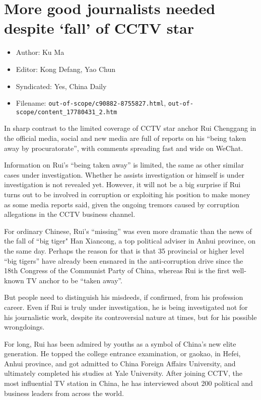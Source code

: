 \section{More good journalists needed despite `fall' of CCTV star}

\begin{itemize}
	\item Author: Ku Ma
	\item Editor: Kong Defang, Yao Chun
	\item Syndicated: Yes, China Daily
	\item Filename: \texttt{out-of-scope/c90882-8755827.html},
	\texttt{out-of-scope/content_17780431_2.htm}
\end{itemize}

\begin{displayquote}

	In sharp contrast to the limited coverage of CCTV star anchor Rui
	Chenggang in the official media, social and new media are full of
	reports on his ``being taken away by procuratorate'', with comments
	spreading fast and wide on WeChat.

	Information on Rui's ``being taken away'' is limited, the same as other
	similar cases under investigation. Whether he assists investigation or
	himself is under investigation is not revealed yet. However, it will not
	be a big surprise if Rui turns out to be involved in corruption or
	exploiting his position to make money as some media reports said, given
	the ongoing tremors caused by corruption allegations in the CCTV
	business channel.

	For ordinary Chinese, Rui's ``missing'' was even more dramatic than the
	news of the fall of ``big tiger" Han Xiancong, a top political adviser
	in Anhui province, on the same day. Perhaps the reason for that is that
	35 provincial or higher level ``big tigers'' have already been ensnared
	in the anti-corruption drive since the 18th Congress of the Communist
	Party of China, whereas Rui is the first well-known TV anchor to be
	``taken away''.

	But people need to distinguish his misdeeds, if confirmed, from his
	profession career. Even if Rui is truly under investigation, he is being
	investigated not for his journalistic work, despite its controversial
	nature at times, but for his possible wrongdoings.

	For long, Rui has been admired by youths as a symbol of China's new
	elite generation. He topped the college entrance examination, or gaokao,
	in Hefei, Anhui province, and got admitted to China Foreign Affairs
	University, and ultimately completed his studies at Yale University.
	After joining CCTV, the most influential TV station in China, he has
	interviewed about 200 political and business leaders from across the
	world.


\end{displayquote}
